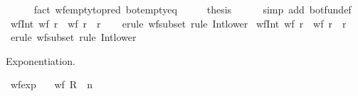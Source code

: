 \begin{isabellebody}
\ \ \ \ \isamarkupfalse%
\ {\isacharparenleft}{\kern0pt}fact\ wf{\isacharunderscore}{\kern0pt}empty{\isacharbrackleft}{\kern0pt}to{\isacharunderscore}{\kern0pt}pred\ bot{\isacharunderscore}{\kern0pt}empty{\isacharunderscore}{\kern0pt}eq{}{\isacharbrackright}{\kern0pt}{\isacharparenright}{\kern0pt}\isanewline
\ \ \isamarkupfalse%
\ \isamarkupfalse%
\ {\isacharquery}{\kern0pt}thesis\isanewline
\ \ \ \ \isamarkupfalse%
\ {\isacharparenleft}{\kern0pt}simp\ add{\isacharcolon}{\kern0pt}\ bot{\isacharunderscore}{\kern0pt}fun{\isacharunderscore}{\kern0pt}def{\isacharparenright}{\kern0pt}\isanewline
{}\isamarkupfalse%
%
\endisatagproof
{\isafoldproof}%
%
\isadelimproof
\isanewline
%
\endisadelimproof
\isanewline
{}\isamarkupfalse%
\ wf{\isacharunderscore}{\kern0pt}Int{}{\isacharcolon}{\kern0pt}\ {\isachardoublequoteopen}wf\ r\ {\isasymLongrightarrow}\ wf\ {\isacharparenleft}{\kern0pt}r\ {\isasyminter}\ r{\isacharprime}{\kern0pt}{\isacharparenright}{\kern0pt}{\isachardoublequoteclose}\isanewline
%
\isadelimproof
\ \ %
\endisadelimproof
%
\isatagproof
{}\isamarkupfalse%
\ {\isacharparenleft}{\kern0pt}erule\ wf{\isacharunderscore}{\kern0pt}subset{\isacharparenright}{\kern0pt}\ {\isacharparenleft}{\kern0pt}rule\ Int{\isacharunderscore}{\kern0pt}lower{}{\isacharparenright}{\kern0pt}%
\endisatagproof
{\isafoldproof}%
%
\isadelimproof
\isanewline
%
\endisadelimproof
\isanewline
{}\isamarkupfalse%
\ wf{\isacharunderscore}{\kern0pt}Int{}{\isacharcolon}{\kern0pt}\ {\isachardoublequoteopen}wf\ r\ {\isasymLongrightarrow}\ wf\ {\isacharparenleft}{\kern0pt}r{\isacharprime}{\kern0pt}\ {\isasyminter}\ r{\isacharparenright}{\kern0pt}{\isachardoublequoteclose}\isanewline
%
\isadelimproof
\ \ %
\endisadelimproof
%
\isatagproof
{}\isamarkupfalse%
\ {\isacharparenleft}{\kern0pt}erule\ wf{\isacharunderscore}{\kern0pt}subset{\isacharparenright}{\kern0pt}\ {\isacharparenleft}{\kern0pt}rule\ Int{\isacharunderscore}{\kern0pt}lower{}{\isacharparenright}{\kern0pt}%
\endisatagproof
{\isafoldproof}%
%
\isadelimproof
%
\endisadelimproof
%
\begin{isamarkuptext}%
Exponentiation.%
\end{isamarkuptext}\isamarkuptrue%
\isamarkupfalse%
\ wf{\isacharunderscore}{\kern0pt}exp{\isacharcolon}{\kern0pt}\isanewline
\ \ \ {\isachardoublequoteopen}wf\ {\isacharparenleft}{\kern0pt}R\ {\isacharcircum}{\kern0pt}{\isacharcircum}{\kern0pt}\ n{\isacharparenright}{\kern0pt}{\isachardoublequoteclose}\isanewline

\end{isabellebody}
